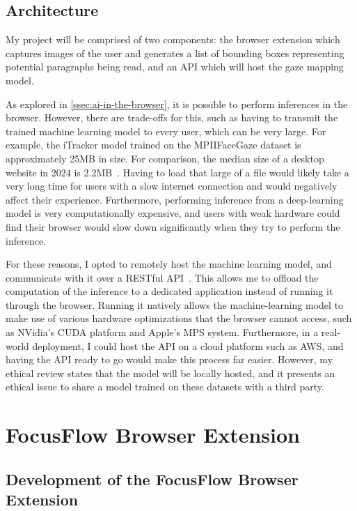 \documentclass{report}
\begin{document}
\section{Architecture}

My project will be comprised of two components: the browser extension which captures images of the user and generates a list of bounding boxes representing potential paragraphs being read, and an API which will host the gaze mapping model.

As explored in \autoref{ssec:ai-in-the-browser}, it is possible to perform inferences in the browser. However, there are trade-offs for this, such as having to transmit the trained machine learning model to every user, which can be very large. For example, the iTracker model trained on the MPIIFaceGaze dataset is approximately 25MB in size. For comparison, the median size of a desktop website in 2024 is 2.2MB~\cite{httparchive2024pageweight}. Having to load that large of a file would likely take a very long time for users with a slow internet connection and would negatively affect their experience. Furthermore, performing inference from a deep-learning model is very computationally expensive, and users with weak hardware could find their browser would slow down significantly when they try to perform the inference. 

For these reasons, I opted to remotely host the machine learning model, and communicate with it over a RESTful API~\cite{fielding2000phd}. This allows me to offload the computation of the inference to a dedicated application instead of running it through the browser. Running it natively allows the machine-learning model to make use of various hardware optimizations that the browser cannot access, such as NVidia's CUDA platform and Apple's MPS system. Furthermore, in a real-world deployment, I could host the API on a cloud platform such as AWS, and having the API ready to go would make this process far easier. However, my ethical review states that the model will be locally hosted, and it presents an ethical issue to share a model trained on these datasets with a third party. 


\chapter{FocusFlow Browser Extension}
\label{chap:methods}

\section{Development of the FocusFlow Browser Extension}
\end{document}
